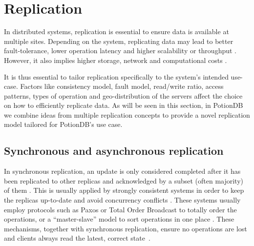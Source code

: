 \section{Replication}
\label{sec:replication}


In distributed systems, replication is essential to ensure data is available at multiple sites.
Depending on the system, replicating data may lead to better fault-tolerance, lower operation latency and higher scalability or throughput %
\cite{cure,bargain,eiger,asymmetric}.
However, it also implies higher storage, network and computational costs \cite{sipre}.

It is thus essential to tailor replication specifically to the system's intended use-case.
Factors like consistency model, fault model, read/write ratio, access patterns, types of operation and geo-distribution of the servers affect the choice on how to efficiently replicate data.
As will be seen in this section, 
in PotionDB we combine ideas from multiple replication concepts to provide a novel replication model tailored for PotionDB's use case.

\subsection{Synchronous and asynchronous replication}
\label{subsec:syncAsync}


In synchronous replication, an update is only considered completed after it has been replicated to other replicas and acknowledged by a subset (often majority) of them \cite{epoch}.
This is usually applied by strongly consistent systems in order to keep the replicas up-to-date and avoid concurrency conflicts \cite{dynamo, spanner,bargain,detock}.
These systems usually employ protocols such as Paxos \cite{paxos} or Total Order Broadcast \cite{tob} to totally order the operations, or a ``master-slave'' model to sort operations in one place \cite{sipre,mdcc,detock,slog}.
These mechanisms, together with synchronous replication, ensure no operations are lost and clients always read the latest, correct state~\cite{spanner,mdcc,sconekv,epoch}.

